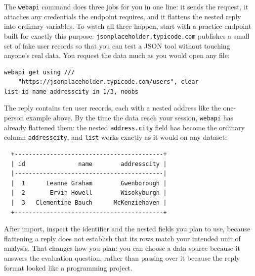 \documentclass[
    a4paper,
    fontsize=10pt,
    twoside=true,
    numbers=noenddot,
]{kaobook}
\begin{document}
The \texttt{webapi} command does three jobs for you in one line: it sends the request, it attaches any credentials the endpoint requires, and it flattens the nested reply into ordinary variables. To watch all three happen, start with a practice endpoint built for exactly this purpose: \texttt{jsonplaceholder.typicode.com} publishes a small set of fake user records so that you can test a JSON tool without touching anyone's real data. You request the data much as you would open any file:
\par
{\footnotesize
\begin{verbatim}
webapi get using ///
    "https://jsonplaceholder.typicode.com/users", clear
list id name addresscity in 1/3, noobs
\end{verbatim}
}
The reply contains ten user records, each with a nested address like the one-person example above. By the time the data reach your session, \texttt{webapi} has already flattened them: the nested \texttt{address.city} field has become the ordinary column \texttt{addresscity}, and \texttt{list} works exactly as it would on any dataset:
\par
{\footnotesize
\begin{verbatim}
  +------------------------------------------+
  | id               name        addresscity |
  |------------------------------------------|
  |  1      Leanne Graham        Gwenborough |
  |  2       Ervin Howell        Wisokyburgh |
  |  3   Clementine Bauch      McKenziehaven |
  +------------------------------------------+
\end{verbatim}
}
After import, inspect the identifier and the nested fields you plan to use, because flattening a reply does not establish that its rows match your intended unit of analysis. That changes how you plan: you can choose a data source because it answers the evaluation question, rather than passing over it because the reply format looked like a programming project.
\end{document}
